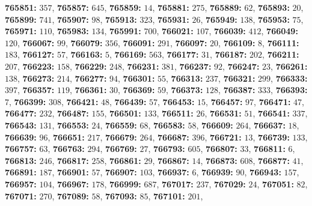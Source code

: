 \textsf{\bfseries 765851:} $357$, \textsf{\bfseries 765857:} $645$, \textsf{\bfseries 765859:} $14$, \textsf{\bfseries 765881:} $275$, \textsf{\bfseries 765889:} $62$, \textsf{\bfseries 765893:} $20$, \textsf{\bfseries 765899:} $741$, \textsf{\bfseries 765907:} $98$, \textsf{\bfseries 765913:} $323$, \textsf{\bfseries 765931:} $26$, \textsf{\bfseries 765949:} $138$, \textsf{\bfseries 765953:} $75$, \textsf{\bfseries 765971:} $110$, \textsf{\bfseries 765983:} $134$, \textsf{\bfseries 765991:} $700$, \textsf{\bfseries 766021:} $107$, \textsf{\bfseries 766039:} $412$, \textsf{\bfseries 766049:} $120$, \textsf{\bfseries 766067:} $99$, \textsf{\bfseries 766079:} $356$, \textsf{\bfseries 766091:} $291$, \textsf{\bfseries 766097:} $20$, \textsf{\bfseries 766109:} $8$, \textsf{\bfseries 766111:} $183$, \textsf{\bfseries 766127:} $57$, \textsf{\bfseries 766163:} $5$, \textsf{\bfseries 766169:} $563$, \textsf{\bfseries 766177:} $31$, \textsf{\bfseries 766187:} $202$, \textsf{\bfseries 766211:} $207$, \textsf{\bfseries 766223:} $158$, \textsf{\bfseries 766229:} $248$, \textsf{\bfseries 766231:} $381$, \textsf{\bfseries 766237:} $92$, \textsf{\bfseries 766247:} $23$, \textsf{\bfseries 766261:} $138$, \textsf{\bfseries 766273:} $214$, \textsf{\bfseries 766277:} $94$, \textsf{\bfseries 766301:} $55$, \textsf{\bfseries 766313:} $237$, \textsf{\bfseries 766321:} $299$, \textsf{\bfseries 766333:} $397$, \textsf{\bfseries 766357:} $119$, \textsf{\bfseries 766361:} $30$, \textsf{\bfseries 766369:} $59$, \textsf{\bfseries 766373:} $128$, \textsf{\bfseries 766387:} $333$, \textsf{\bfseries 766393:} $7$, \textsf{\bfseries 766399:} $308$, \textsf{\bfseries 766421:} $48$, \textsf{\bfseries 766439:} $57$, \textsf{\bfseries 766453:} $15$, \textsf{\bfseries 766457:} $97$, \textsf{\bfseries 766471:} $47$, \textsf{\bfseries 766477:} $232$, \textsf{\bfseries 766487:} $155$, \textsf{\bfseries 766501:} $133$, \textsf{\bfseries 766511:} $26$, \textsf{\bfseries 766531:} $51$, \textsf{\bfseries 766541:} $337$, \textsf{\bfseries 766543:} $131$, \textsf{\bfseries 766553:} $24$, \textsf{\bfseries 766559:} $68$, \textsf{\bfseries 766583:} $58$, \textsf{\bfseries 766609:} $264$, \textsf{\bfseries 766637:} $18$, \textsf{\bfseries 766639:} $96$, \textsf{\bfseries 766651:} $217$, \textsf{\bfseries 766679:} $264$, \textsf{\bfseries 766687:} $396$, \textsf{\bfseries 766721:} $13$, \textsf{\bfseries 766739:} $133$, \textsf{\bfseries 766757:} $63$, \textsf{\bfseries 766763:} $294$, \textsf{\bfseries 766769:} $27$, \textsf{\bfseries 766793:} $605$, \textsf{\bfseries 766807:} $33$, \textsf{\bfseries 766811:} $6$, \textsf{\bfseries 766813:} $246$, \textsf{\bfseries 766817:} $258$, \textsf{\bfseries 766861:} $29$, \textsf{\bfseries 766867:} $14$, \textsf{\bfseries 766873:} $608$, \textsf{\bfseries 766877:} $41$, \textsf{\bfseries 766891:} $187$, \textsf{\bfseries 766901:} $57$, \textsf{\bfseries 766907:} $103$, \textsf{\bfseries 766937:} $6$, \textsf{\bfseries 766939:} $90$, \textsf{\bfseries 766943:} $157$, \textsf{\bfseries 766957:} $104$, \textsf{\bfseries 766967:} $178$, \textsf{\bfseries 766999:} $687$, \textsf{\bfseries 767017:} $237$, \textsf{\bfseries 767029:} $24$, \textsf{\bfseries 767051:} $82$, \textsf{\bfseries 767071:} $270$, \textsf{\bfseries 767089:} $58$, \textsf{\bfseries 767093:} $85$, \textsf{\bfseries 767101:} $201$, 
